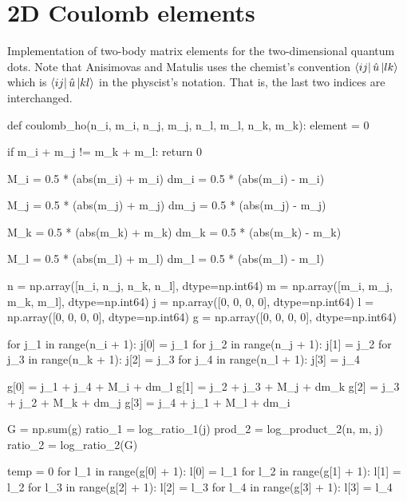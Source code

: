 \chapter{2D Coulomb elements}
\label{app:anisimovas}
Implementation of two-body matrix elements for the two-dimensional
quantum dots\cite{anisimovas1998energy}. Note that Anisimovas and Matulis uses the chemist's convention 
$\bra{ij} \hat{u} \ket{lk}$ which is 
$\bra{ij} \hat{u} \ket{kl}$ in the physcist's notation.
That is, the last two indices are interchanged.

\begin{python}
def coulomb_ho(n_i, m_i, n_j, m_j, n_l, m_l, n_k, m_k):
    element = 0

    if m_i + m_j != m_k + m_l:
        return 0

    M_i = 0.5 * (abs(m_i) + m_i)
    dm_i = 0.5 * (abs(m_i) - m_i)

    M_j = 0.5 * (abs(m_j) + m_j)
    dm_j = 0.5 * (abs(m_j) - m_j)

    M_k = 0.5 * (abs(m_k) + m_k)
    dm_k = 0.5 * (abs(m_k) - m_k)

    M_l = 0.5 * (abs(m_l) + m_l)
    dm_l = 0.5 * (abs(m_l) - m_l)

    n = np.array([n_i, n_j, n_k, n_l], dtype=np.int64)
    m = np.array([m_i, m_j, m_k, m_l], dtype=np.int64)
    j = np.array([0, 0, 0, 0], dtype=np.int64)
    l = np.array([0, 0, 0, 0], dtype=np.int64)
    g = np.array([0, 0, 0, 0], dtype=np.int64)

    for j_1 in range(n_i + 1):
        j[0] = j_1
        for j_2 in range(n_j + 1):
            j[1] = j_2
            for j_3 in range(n_k + 1):
                j[2] = j_3
                for j_4 in range(n_l + 1):
                    j[3] = j_4

                    g[0] = j_1 + j_4 + M_i + dm_l
                    g[1] = j_2 + j_3 + M_j + dm_k
                    g[2] = j_3 + j_2 + M_k + dm_j
                    g[3] = j_4 + j_1 + M_l + dm_i

                    G = np.sum(g)
                    ratio_1 = log_ratio_1(j)
                    prod_2 = log_product_2(n, m, j)
                    ratio_2 = log_ratio_2(G)

                    temp = 0
                    for l_1 in range(g[0] + 1):
                        l[0] = l_1
                        for l_2 in range(g[1] + 1):
                            l[1] = l_2
                            for l_3 in range(g[2] + 1):
                                l[2] = l_3
                                for l_4 in range(g[3] + 1):
                                    l[3] = l_4


\end{python}
